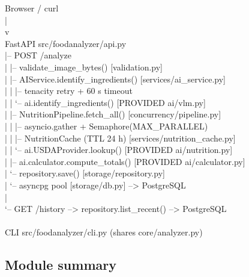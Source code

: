 \documentclass[11pt,a4paper]{article}
\begin{document}
\begin{tcolorbox}[colback=archbg, colframe=black!25, boxrule=0.4pt,
  arc=2pt, left=6pt, right=6pt, top=4pt, bottom=4pt,
  fontupper=\ttfamily\small]
Browser / curl\\
\phantom{xx}|\\
\phantom{xx}v\\
FastAPI  src/foodanalyzer/api.py\\
\phantom{xx}|-- POST /analyze\\
\phantom{xx}|     |-- validate\_image\_bytes()           [validation.py]\\
\phantom{xx}|     |-- AIService.identify\_ingredients()  [services/ai\_service.py]\\
\phantom{xx}|     |       |-- tenacity retry + 60 s timeout\\
\phantom{xx}|     |       `-- ai.identify\_ingredients() [PROVIDED ai/vlm.py]\\
\phantom{xx}|     |-- NutritionPipeline.fetch\_all()    [concurrency/pipeline.py]\\
\phantom{xx}|     |       |-- asyncio.gather + Semaphore(MAX\_PARALLEL)\\
\phantom{xx}|     |       |-- NutritionCache (TTL 24 h) [services/nutrition\_cache.py]\\
\phantom{xx}|     |       `-- ai.USDAProvider.lookup()  [PROVIDED ai/nutrition.py]\\
\phantom{xx}|     |-- ai.calculator.compute\_totals()   [PROVIDED ai/calculator.py]\\
\phantom{xx}|     `-- repository.save()                [storage/repository.py]\\
\phantom{xx}|             `-- asyncpg pool             [storage/db.py] --> PostgreSQL\\
\phantom{xx}|\\
\phantom{xx}`-- GET /history  --> repository.list\_recent() --> PostgreSQL\\
\\
CLI  src/foodanalyzer/cli.py  (shares core/analyzer.py)
\end{tcolorbox}

\subsection{Module summary}
\end{document}
